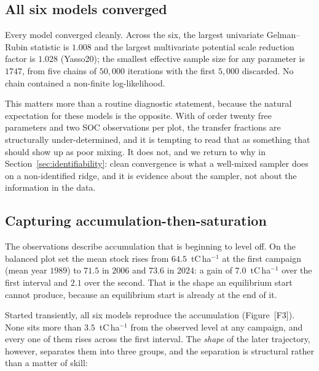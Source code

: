 \documentclass[11pt]{article}
\begin{document}
\subsection{All six models converged}
Every model converged cleanly. Across the six, the largest univariate
Gelman--Rubin statistic is $1.008$ and the largest multivariate potential scale
reduction factor is $1.028$ (Yasso20); the smallest effective sample size for
any parameter is $1747$, from five chains of $50{,}000$ iterations with the
first $5{,}000$ discarded. No chain contained a non-finite log-likelihood.

This matters more than a routine diagnostic statement, because the natural
expectation for these models is the opposite. With of order twenty free
parameters and two SOC observations per plot, the transfer fractions are
structurally under-determined, and it is tempting to read that as something
that should show up as poor mixing. It does not, and we return to why in
Section~\ref{sec:identifiability}: clean convergence is what a well-mixed
sampler does on a non-identified ridge, and it is evidence about the sampler,
not about the information in the data.

\subsection{Capturing accumulation-then-saturation}
The observations describe accumulation that is beginning to level off. On the
balanced plot set the mean stock rises from $64.5$~tC\,ha$^{-1}$ at the first
campaign (mean year $1989$) to $71.5$ in $2006$ and $73.6$ in $2024$: a gain of
$7.0$~tC\,ha$^{-1}$ over the first interval and $2.1$ over the second. That is
the shape an equilibrium start cannot produce, because an equilibrium start is
already at the end of it.

Started transiently, all six models reproduce the accumulation
(Figure~[F3]). None sits more than $3.5$~tC\,ha$^{-1}$ from the observed level
at any campaign, and every one of them rises across the first interval. The
\emph{shape} of the later trajectory, however, separates them into three
groups, and the separation is structural rather than a matter of skill:
\end{document}

